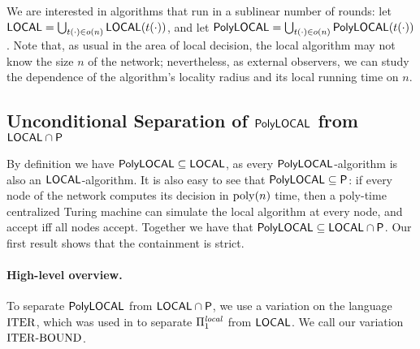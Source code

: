 We are interested in algorithms that run in a sublinear number of rounds:
let ${\mathsf{LOCAL}} = \bigcup_{t(\cdot) \in o(n)} {\mathsf{LOCAL}}(t(\cdot))$,
and let ${\mathsf{PolyLOCAL}} = \bigcup_{t(\cdot) \in o(n)} {\mathsf{PolyLOCAL}}(t(\cdot))$.
Note that, as usual in the area of local decision, the local algorithm may not know the size $n$
of the network;
nevertheless, as external observers,
we can study the dependence of the algorithm's locality radius and its local running time on $n$.




\subsection{Unconditional Separation of ${\mathsf{PolyLOCAL}}$ from ${\mathsf{LOCAL}} \cap {\mathsf{P}}$}\label{sec:uncond}
By definition we have ${\mathsf{PolyLOCAL}} \subseteq {\mathsf{LOCAL}}$,
as every ${\mathsf{PolyLOCAL}}$-algorithm is also an ${\mathsf{LOCAL}}$-algorithm.
It is also easy to see that ${\mathsf{PolyLOCAL}} \subseteq {\mathsf{P}}$:
if every node of the network computes its decision in $\operatorname{poly}(n)$ time,
then a poly-time centralized Turing machine can simulate the local algorithm
at every node, and accept iff all nodes accept.
Together we have that ${\mathsf{PolyLOCAL}} \subseteq {\mathsf{LOCAL}} \cap {\mathsf{P}}$.
Our first result shows that the containment is strict.

\paragraph{High-level overview.}
To separate ${\mathsf{PolyLOCAL}}$ from ${\mathsf{LOCAL}} \cap {\mathsf{P}}$,
we use a variation on the language ${\mathrm{ITER}}$, which was used in \cite{balliu2018can} to separate ${\Pi_{1}^{\mathit{ local }}}$ from ${\mathsf{LOCAL}}$.
We call our variation ${\mathrm{ITER\text{-}BOUND}}$.

